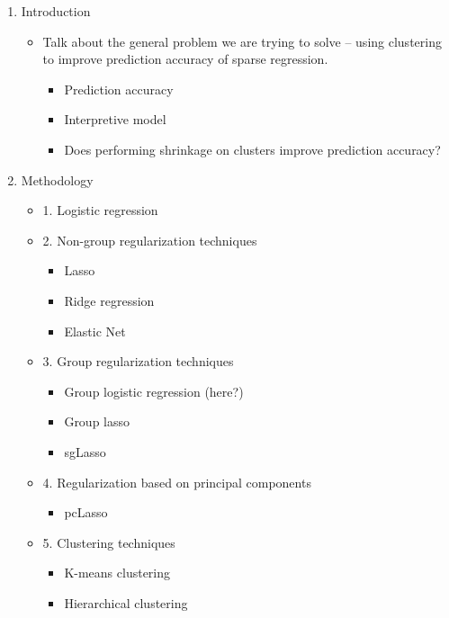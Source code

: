 \documentclass[11pt]{article}
\begin{document}
\begin{enumerate}
    \item Introduction
    \begin{itemize}
        \item Talk about the general problem we are trying to solve -- using clustering to improve prediction accuracy of sparse regression. 
        \begin{itemize}
            \item Prediction accuracy
            \item Interpretive model
            \item Does performing shrinkage on clusters improve prediction accuracy?
        \end{itemize}
    \end{itemize}
    \item Methodology
    \begin{itemize}
        \item 1. Logistic regression
        \item 2. Non-group regularization techniques
        \begin{itemize}
            \item Lasso
            \item Ridge regression
            \item Elastic Net
        \end{itemize}
        \item 3. Group regularization techniques
        \begin{itemize}
            \item Group logistic regression (here?)
            \item Group lasso
            \item sgLasso
        \end{itemize}
        \item 4. Regularization based on principal components
        \begin{itemize}
            \item pcLasso
        \end{itemize}
        \item 5. Clustering techniques
        \begin{itemize}
            \item K-means clustering
            \item Hierarchical clustering
        \end{itemize}
    \end{itemize}

\end{enumerate}
\end{document}
